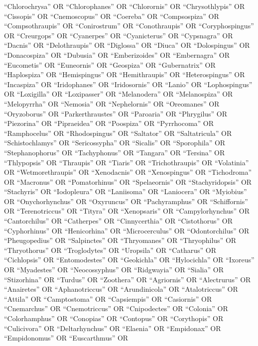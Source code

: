 \documentclass[
  number,
  review,
  onecolumn]{elsarticle}
\begin{document}
``Chlorochrysa'' OR ``Chlorophanes'' OR ``Chlorornis'' OR
``Chrysothlypis'' OR ``Cissopis'' OR ``Cnemoscopus'' OR ``Coereba'' OR
``Compsospiza'' OR ``Compsothraupis'' OR ``Conirostrum'' OR
``Conothraupis'' OR ``Coryphospingus'' OR ``Creurgops'' OR ``Cyanerpes''
OR ``Cyanicterus'' OR ``Cypsnagra'' OR ``Dacnis'' OR ``Delothraupis'' OR
``Diglossa'' OR ``Diuca'' OR ``Dolospingus'' OR ``Donacospiza'' OR
``Dubusia'' OR ``Emberizoides'' OR ``Embernagra'' OR ``Eucometis'' OR
``Euneornis'' OR ``Geospiza'' OR ``Gubernatrix'' OR ``Haplospiza'' OR
``Hemispingus'' OR ``Hemithraupis'' OR ``Heterospingus'' OR
``Incaspiza'' OR ``Iridophanes'' OR ``Iridosornis'' OR ``Lanio'' OR
``Lophospingus'' OR ``Loxigilla'' OR ``Loxipasser'' OR ``Melanodera'' OR
``Melanospiza'' OR ``Melopyrrha'' OR ``Nemosia'' OR ``Nephelornis'' OR
``Oreomanes'' OR ``Oryzoborus'' OR ``Parkerthraustes'' OR ``Paroaria''
OR ``Phrygilus'' OR ``Piezorina'' OR ``Pipraeidea'' OR ``Poospiza'' OR
``Pyrrhocoma'' OR ``Ramphocelus'' OR ``Rhodospingus'' OR ``Saltator'' OR
``Saltatricula'' OR ``Schistochlamys'' OR ``Sericossypha'' OR
``Sicalis'' OR ``Sporophila'' OR ``Stephanophorus'' OR ``Tachyphonus''
OR ``Tangara'' OR ``Tersina'' OR ``Thlypopsis'' OR ``Thraupis'' OR
``Tiaris'' OR ``Trichothraupis'' OR ``Volatinia'' OR ``Wetmorethraupis''
OR ``Xenodacnis'' OR ``Xenospingus'' OR ``Tichodroma'' OR ``Macronus''
OR ``Pomatorhinus'' OR ``Spelaeornis'' OR ``Stachyridopsis'' OR
``Stachyris'' OR ``Iodopleura'' OR ``Laniisoma'' OR ``Laniocera'' OR
``Myiobius'' OR ``Onychorhynchus'' OR ``Oxyruncus'' OR ``Pachyramphus''
OR ``Schiffornis'' OR ``Terenotriccus'' OR ``Tityra'' OR ``Xenopsaris''
OR ``Campylorhynchus'' OR ``Cantorchilus'' OR ``Catherpes'' OR
``Cinnycerthia'' OR ``Cistothorus'' OR ``Cyphorhinus'' OR
``Henicorhina'' OR ``Microcerculus'' OR ``Odontorchilus'' OR
``Pheugopedius'' OR ``Salpinctes'' OR ``Thryomanes'' OR ``Thryophilus''
OR ``Thryothorus'' OR ``Troglodytes'' OR ``Uropsila'' OR ``Catharus'' OR
``Cichlopsis'' OR ``Entomodestes'' OR ``Geokichla'' OR ``Hylocichla'' OR
``Ixoreus'' OR ``Myadestes'' OR ``Neocossyphus'' OR ``Ridgwayia'' OR
``Sialia'' OR ``Stizorhina'' OR ``Turdus'' OR ``Zoothera'' OR
``Agriornis'' OR ``Alectrurus'' OR ``Anairetes'' OR ``Aphanotriccus'' OR
``Arundinicola'' OR ``Atalotriccus'' OR ``Attila'' OR ``Camptostoma'' OR
``Capsiempis'' OR ``Casiornis'' OR ``Cnemarchus'' OR ``Cnemotriccus'' OR
``Cnipodectes'' OR ``Colonia'' OR ``Colorhamphus'' OR ``Conopias'' OR
``Contopus'' OR ``Corythopis'' OR ``Culicivora'' OR ``Deltarhynchus'' OR
``Elaenia'' OR ``Empidonax'' OR ``Empidonomus'' OR ``Euscarthmus'' OR
\end{document}
